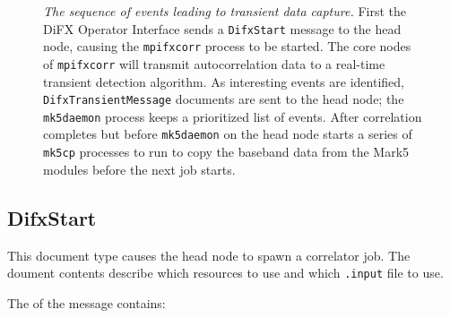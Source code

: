 \begin{description}
\begin{figure}[h]
\begin{center}
\caption[blockdiagram]{
{{\em The sequence of events leading to transient data capture.}
First the DiFX Operator Interface sends a {\tt DifxStart} message to the head node, causing the {\tt mpifxcorr} process to be started.
The core nodes of {\tt mpifxcorr} will transmit autocorrelation data to a real-time transient detection algorithm.
As interesting events are identified, {\tt DifxTransientMessage} documents are sent to the head node; the {\tt mk5daemon} process keeps a prioritized list of events.
After correlation completes but before {\tt mk5daemon} on the head node starts a series of {\tt mk5cp} processes to run to copy the baseband data from the Mark5 modules before the next job starts.
}
\label{fig:transient}
}
\end{center}
\end{figure}






\subsection{DifxStart}

This document type causes the head node to spawn a correlator job.
The doument contents describe which resources to use and which {\tt .input} file to use.

The  of the message contains:


\end{description}
